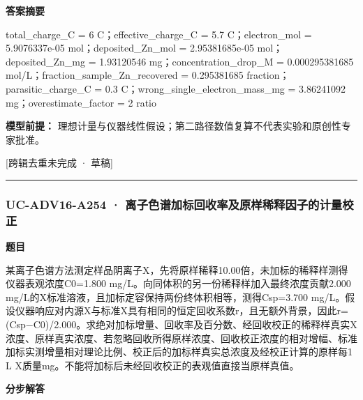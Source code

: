 \documentclass[UTF8,11pt,a4paper]{ctexart}
\begin{document}
\noindent\textbf{答案摘要}\par
total\_charge\_C = 6 C；effective\_charge\_C = 5.7 C；electron\_mol = 5.9076337e-05 mol；deposited\_Zn\_mol = 2.95381685e-05 mol；deposited\_Zn\_mg = 1.93120546 mg；concentration\_drop\_M = 0.000295381685 mol/L；fraction\_sample\_Zn\_recovered = 0.295381685 fraction；parasitic\_charge\_C = 0.3 C；wrong\_single\_electron\_mass\_mg = 3.86241092 mg；overestimate\_factor = 2 ratio\par
\noindent\textbf{模型前提：}
理想计量与仪器线性假设；第二路径数值复算不代表实验和原创性专家批准。\par
\noindent\textcolor{red!65!black}{[跨辑去重未完成 · 草稿]} \par
\medskip\hrule\medskip
{}
\subsubsection*{UC-ADV16-A254 · 离子色谱加标回收率及原样稀释因子的计量校正}
\noindent\textbf{题目}\par
某离子色谱方法测定样品阴离子X，先将原样稀释10.00倍，未加标的稀释样测得仪器表观浓度C0=1.800 mg/L。向同体积的另一份稀释样加入最终浓度贡献2.000 mg/L的X标准溶液，且加标定容保持两份终体积相等，测得Csp=3.700 mg/L。假设仪器响应对内源X与标准X具有相同的恒定回收系数r，且无额外背景，因此r=(Csp−C0)/2.000。求绝对加标增量、回收率及百分数、经回收校正的稀释样真实X浓度、原样真实浓度、若忽略回收所得原样浓度、回收校正浓度的相对增幅、标准加标实测增量相对理论比例、校正后的加标样真实总浓度及经校正计算的原样每1 L X质量mg。不能将加标后未经回收校正的表观值直接当原样真值。\par
\medskip\noindent\textbf{分步解答}
\end{document}
